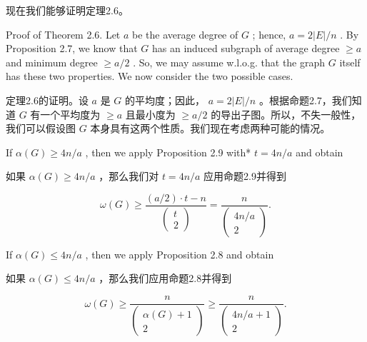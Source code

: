 \documentclass[10pt]{article}
\begin{document}
\begin{tcolorbox}\relax
现在我们能够证明定理2.6。
\end{tcolorbox}

Proof of Theorem 2.6. Let \(a\) be the average degree of \(G\) ; hence, \(a = 2\left| E\right| /n\) . By Proposition 2.7, we know that \(G\) has an induced subgraph of average degree \(\geq  a\) and minimum degree \(\geq  a/2\) . So, we may assume w.l.o.g. that the graph \(G\) itself has these two properties. We now consider the two possible cases.

\begin{tcolorbox}\relax
定理2.6的证明。设 \(a\) 是 \(G\) 的平均度；因此， \(a = 2\left| E\right| /n\) 。根据命题2.7，我们知道 \(G\) 有一个平均度为 \(\geq  a\) 且最小度为 \(\geq  a/2\) 的导出子图。所以，不失一般性，我们可以假设图 \(G\) 本身具有这两个性质。我们现在考虑两种可能的情况。
\end{tcolorbox}

If \(\alpha \left( G\right)  \geq  {4n}/a\) , then we apply Proposition 2.9 with* \(t = {4n}/a\) and obtain

\begin{tcolorbox}\relax
如果 \(\alpha \left( G\right)  \geq  {4n}/a\) ，那么我们对 \(t = {4n}/a\) 应用命题2.9并得到
\end{tcolorbox}

\[
\omega \left( G\right)  \geq  \frac{\left( {a/2}\right)  \cdot  t - n}{\left( \begin{array}{l} t \\  2 \end{array}\right) } = \frac{n}{\left( \begin{matrix} {4n}/a \\  2 \end{matrix}\right) }.
\]

If \(\alpha \left( G\right)  \leq  {4n}/a\) , then we apply Proposition 2.8 and obtain

\begin{tcolorbox}\relax
如果 \(\alpha \left( G\right)  \leq  {4n}/a\) ，那么我们应用命题2.8并得到
\end{tcolorbox}

\[
\omega \left( G\right)  \geq  \frac{n}{\left( \begin{matrix} \alpha \left( G\right)  + 1 \\  2 \end{matrix}\right) } \geq  \frac{n}{\left( \begin{matrix} {4n}/a + 1 \\  2 \end{matrix}\right) }.
\]
\end{document}
